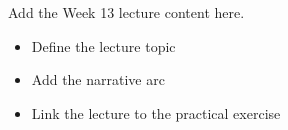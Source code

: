 Add the Week 13 lecture content here.

\begin{itemize}
  \item Define the lecture topic
  \item Add the narrative arc
  \item Link the lecture to the practical exercise
\end{itemize}
